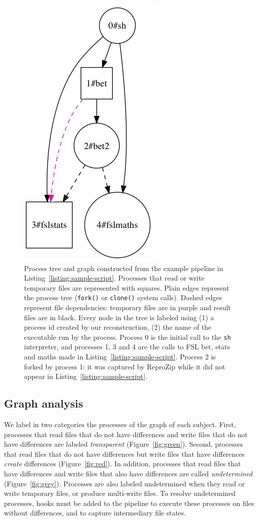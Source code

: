 \documentclass[a4paper,num-refs]{oup-contemporary}
\newcommand{\reprozip}[0]{ReproZip\xspace}
\begin{document}
\begin{figure}
\centering
  \includegraphics[width=0.3\columnwidth]{images/simple_graph}
  \caption{Process tree and graph
  constructed from the example pipeline in
  Listing~\ref{listing:sample-script}.
  Processes that read or write
  temporary files are 
  represented with squares. Plain edges 
  represent the process tree (\texttt{fork()} or \texttt{clone()} 
  system calls). Dashed edges represent file dependencies: temporary 
  files are in purple and result files are in black.
  Every node in the tree is labeled using (1) a process id created by our
  reconstruction, (2) the name of the executable run by the process.
  Process 0 is the initial call to the \texttt{sh} interpreter, and
  processes 1, 3 and 4 are the calls to FSL bet, stats and maths made in
  Listing~\ref{listing:sample-script}. Process 2 is forked by process 1: it
  was captured by \reprozip while it did not appear in
  Listing~\ref{listing:sample-script}. 
}
  \label{fig:simple_script}
\end{figure}


\subsection{Graph analysis}

We label in two categories the processes of the graph of each subject. First,
processes that read files that do not have differences and write files that
do not have differences are labeled \emph{transparent}
(Figure~\ref{fig:green}). Second, processes that read files that do not
have differences but write files that have differences \emph{create}
differences (Figure~\ref{fig:red}). In addition, processes that read files
that have differences and write files that also have differences are called
\emph{undetermined} (Figure~\ref{fig:grey}). Processes are also labeled
undetermined when they read or write temporary files, or produce multi-write
files. To resolve undetermined processes, hooks must be added to the pipeline to 
execute these processes on files without differences, and to capture
intermediary file states.
\end{document}
